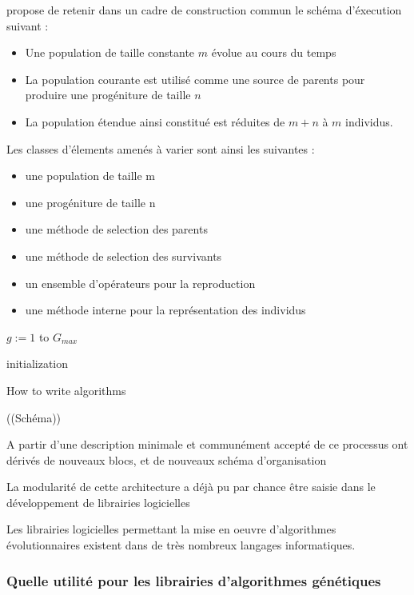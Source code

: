 \textcite{DeJong2006a} propose de retenir dans un cadre de construction commun le schéma d'éxecution suivant : 

\begin{itemize}
\item Une population de taille constante $m$ évolue au cours du temps
\item La population courante est utilisé comme une source de parents pour produire une progéniture de taille $n$
\item La population étendue ainsi constitué est réduites de $m + n$ à $m$ individus.
\end{itemize}

Les classes d'élements amenés à varier sont ainsi les suivantes : 

\begin{itemize}
\item une population de taille m
\item une progéniture de taille n
\item une méthode de selection des parents
\item une méthode de selection des survivants
\item un ensemble d'opérateurs pour la reproduction
\item une méthode interne pour la représentation des individus
\end{itemize}


$g := 1$ to $G_{max}$

\begin{algorithm}[H]
 initialization\;
 \caption{How to write algorithms}
\end{algorithm}

((Schéma))

A partir d'une description minimale et communément accepté de ce processus ont dérivés de nouveaux blocs, et de nouveaux schéma d'organisation

La modularité de cette architecture a déjà pu par chance être saisie dans le développement de librairies logicielles 


Les librairies logicielles permettant la mise en oeuvre d'algorithmes évolutionnaires existent dans de très nombreux langages informatiques.


\subsubsection{Quelle utilité pour les librairies d'algorithmes génétiques}


